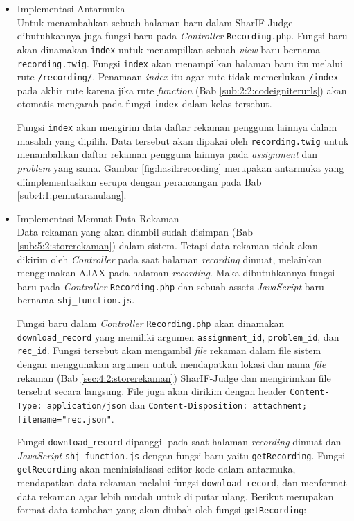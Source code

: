 \begin{itemize}
    \item {Implementasi Antarmuka} \\
    Untuk menambahkan sebuah halaman baru dalam SharIF-Judge dibutuhkannya juga fungsi baru pada \textit{Controller} \verb|Recording.php|. Fungsi baru akan dinamakan \verb|index| untuk menampilkan sebuah \textit{view} baru bernama \verb|recording.twig|. Fungsi \verb|index| akan menampilkan halaman baru itu melalui rute \verb|/recording/|. Penamaan \textit{index} itu agar rute tidak memerlukan \verb|/index| pada akhir rute karena jika rute \textit{function} (Bab \ref{sub:2:2:codeigniterurls}) akan otomatis mengarah pada fungsi \verb|index| dalam kelas tersebut.

    Fungsi \verb|index| akan mengirim data daftar rekaman pengguna lainnya dalam masalah yang dipilih. Data tersebut akan dipakai oleh \verb|recording.twig| untuk menambahkan daftar rekaman pengguna lainnya pada \textit{assignment} dan \textit{problem} yang sama. Gambar \ref{fig:hasil:recording} merupakan antarmuka yang diimplementasikan serupa dengan perancangan pada Bab \ref{sub:4:1:pemutaranulang}.

    \item Implementasi Memuat Data Rekaman \\
    \label{ssub:5:2:4:memuatdata}Data rekaman yang akan diambil sudah disimpan (Bab \ref{sub:5:2:storerekaman}) dalam sistem. Tetapi data rekaman tidak akan dikirim oleh \textit{Controller} pada saat halaman \textit{recording} dimuat, melainkan menggunakan AJAX pada halaman \textit{recording}. Maka dibutuhkannya fungsi baru pada \textit{Controller} \verb|Recording.php| dan sebuah assets \textit{JavaScript} baru bernama \verb|shj_function.js|.

    Fungsi baru dalam \textit{Controller} \verb|Recording.php| akan dinamakan \verb|download_record| yang memiliki argumen \verb|assignment_id|, \verb|problem_id|, dan \verb|rec_id|. Fungsi tersebut akan mengambil \textit{file} rekaman dalam file sistem dengan menggunakan argumen untuk mendapatkan lokasi dan nama \textit{file} rekaman (Bab \ref{sec:4:2:storerekaman}) SharIF-Judge dan mengirimkan file tersebut secara langsung. File juga akan dirikim dengan header \verb|Content-Type: application/json| dan \verb|Content-Disposition: attachment; filename=|\verb|"rec.json"|.

    Fungsi \verb|download_record| dipanggil pada saat halaman \textit{recording} dimuat dan \textit{JavaScript} \verb|shj_function.js| dengan fungsi baru yaitu \verb|getRecording|. Fungsi \verb|getRecording| akan meninisialisasi editor kode dalam antarmuka, mendapatkan data rekaman melalui fungsi \verb|download_record|, dan menformat data rekaman agar lebih mudah untuk di putar ulang. Berikut merupakan format data tambahan yang akan diubah oleh fungsi \verb|getRecording|:


\end{itemize}
